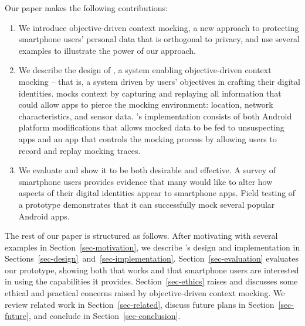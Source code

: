 Our paper makes the following contributions:

\begin{enumerate}

\item We introduce objective-driven context mocking, a new approach to
protecting smartphone users' personal data that is orthogonal to privacy, and
use several examples to illustrate the power of our approach.

\item We describe the design of \PocketMocker{}, a system enabling
objective-driven context mocking -- that is, a system driven by users'
objectives in crafting their digital identities.  \PocketMocker{} mocks
context by capturing and replaying all information that could allow
apps to pierce the mocking environment: location,
network characteristics, and sensor data. \PocketMocker{}'s implementation
consists of both Android platform modifications that allows mocked data to be
fed to unsuspecting apps and an app that controls the mocking process by
allowing users to record and replay mocking traces.

\item We evaluate \PocketMocker{} and show it to be both desirable and
effective. A survey of smartphone users provides evidence that many would
like to alter how aspects of their digital identities appear to smartphone
apps. Field testing of a \PocketMocker{} prototype demonstrates that
it can successfully mock several popular Android apps.

\end{enumerate}

The rest of our paper is structured as follows. After motivating
\PocketMocker{} with several examples in Section~\ref{sec-motivation}, we
describe \PocketMocker{}'s design and implementation in
Sections~\ref{sec-design}~and~\ref{sec-implementation}.
Section~\ref{sec-evaluation} evaluates our \PocketMocker{} prototype, showing
both that \PocketMocker{} works and that smartphone users are interested in
using the capabilities it provides. Section~\ref{sec-ethics} raises and
discusses some ethical and practical concerns raised by objective-driven
context mocking. We review related work in Section~\ref{sec-related}, discuss
future plans in Section~\ref{sec-future}, and conclude in
Section~\ref{sec-conclusion}.
